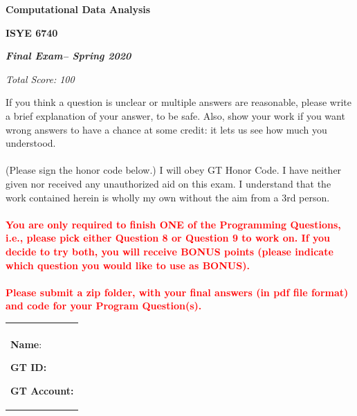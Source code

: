 \documentclass[a4paper,12pt,fleqn]{article}
\newcommand{\titlehd}{Computational Data Analysis}
\newcommand{\examtype}{\bf Final Exam}
\newcommand{\examdate}{Spring 2020}
\newcommand{\examcode}{ISYE 6740}
\newcommand{\total}{100}
\begin{document}
\begin{center}
\large\textbf{\titlehd}
\end{center}

\begin{center}
\large\textbf{\examcode}
\end{center}

\begin{center}
\textit{ \examtype -- \examdate}
\end{center}


\begin{center}
\textit{Total Score: \total}
\end{center}

\vspace{2cm}
If you think a question is unclear or multiple answers are reasonable, please write a brief explanation of your answer,
 to be safe. Also, show your work if you want wrong answers to have a chance at some credit: it lets us see how much you understood.\\\\
(Please sign the honor code below.) I will obey GT Honor Code. I have neither given nor received any unauthorized aid on this exam. I understand that the work contained herein is wholly my own without the aim from a 3rd person. %
\\\\

\textcolor{red}{\bf
You are only required to finish ONE of the Programming Questions, i.e., please pick either Question 8 or Question 9 to work on. If you decide to try both, you will receive BONUS points (please indicate which question you would like to use as BONUS).
}\\\\

\textcolor{red}{\bf Please submit a zip folder, with your final answers (in pdf file format) and code for your Program Question(s).}


\begin{table}[h]
\centering
\begin{tabular}{m{8cm}}
\\
\\
\vspace{0.2in}
\textbf{Name}: 
\vspace{0.7in}

\textbf{GT ID:}
\vspace{0.7in}


\textbf{GT Account:}
\end{tabular}
\end{table}
\newpage
\end{document}
